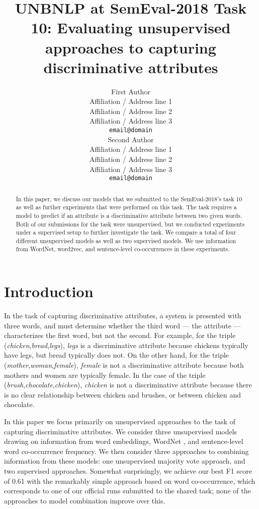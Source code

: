 \documentclass[11pt,a4paper]{article}
\title{UNBNLP at SemEval-2018 Task 10: Evaluating unsupervised
  approaches to capturing discriminative attributes}
\author{First Author \\
  Affiliation / Address line 1 \\
  Affiliation / Address line 2 \\
  Affiliation / Address line 3 \\
  {\tt email@domain} \\\And
  Second Author \\
  Affiliation / Address line 1 \\
  Affiliation / Address line 2 \\
  Affiliation / Address line 3 \\
  {\tt email@domain} \\}
\date{}
\begin{document}
\maketitle
\begin{abstract}

In this paper, we discuss our models that we submitted to the
SemEval-2018's task 10 as well as further experiments that were
performed on this task. The task requires a model to predict if an
attribute is a discriminative attribute between two given words. Both
of our submissions for the task were unsupervised, but we conducted
experiments under a supervised setup to further investigate the
task. We compare a total of four different unsupervised models as well
as two supervised models. We use information from WordNet, word2vec,
and sentence-level co-occurrences in these experiments.
\end{abstract}

\section{Introduction}

In the task of capturing discriminative attributes, a system is
presented with three words, and must determine whether the third word
--- the attribute --- characterizes the first word, but not the
second. For example, for the triple
(\emph{chicken},\emph{bread},\emph{legs}), \emph{legs} is a
discriminative attribute because chickens typically have legs, but
bread typically does not. On the other hand, for the triple
(\emph{mother},\emph{woman},\emph{female}), \emph{female} is not a
discriminative attribute because both mothers and women are typically
female. In the case of the triple
(\emph{brush},\emph{chocolate},\emph{chicken}), \emph{chicken} is not
a discriminative attribute because there is no clear relationship
between chicken and brushes, or between chicken and chocolate.

In this paper we focus primarily on unsupervised approaches to the
task of capturing discriminative attributes. We consider three
unsupervised models drawing on information from word embeddings,
WordNet \citep{Fellbaum1998}, and sentence-level word co-occurrence
frequency. We then consider three approaches to combining information
from these models: one unsupervised majority vote approach, and two
supervised approaches. Somewhat surprisingly, we achieve our best F1
score of 0.61 with the remarkably simple approach based on word
co-occurrence, which corresponds to one of our official runs submitted
to the shared task; none of the approaches to model combination
improve over this.
\end{document}
